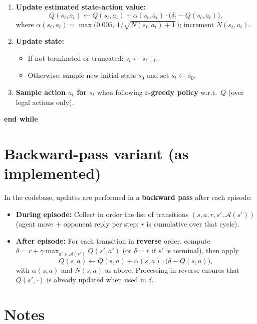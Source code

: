 \documentclass[11pt,a4paper]{article}
\begin{document}
\begin{enumerate}[noitemsep, leftmargin=*]
  \item \textbf{Update estimated state-action value:}
  \[
  Q(s_t, a_t) \leftarrow Q(s_t, a_t) + \alpha(s_t, a_t) \cdot \bigl( \delta_t - Q(s_t, a_t) \bigr),
  \]
  where $\alpha(s_t, a_t) = \max\bigl(0.005,\, 1\big/\sqrt{N(s_t,a_t)+1}\,\bigr)$; increment $N(s_t, a_t)$.

  \item \textbf{Update state:}
  \begin{itemize}[noitemsep]
    \item If not terminated or truncated: $s_t \leftarrow s_{t+1}$.
    \item Otherwise: sample new initial state $s_0$ and set $s_t \leftarrow s_0$.
  \end{itemize}

  \item \textbf{Sample action $a_t$ for $s_t$} when following \textbf{$\varepsilon$-greedy policy} w.r.t.\ $Q$ (over legal actions only).
\end{enumerate}

\textbf{end while}

\hrulefill

\section*{Backward-pass variant (as implemented)}

In the codebase, updates are performed in a \textbf{backward pass} after each episode:

\begin{itemize}[noitemsep]
  \item \textbf{During episode:} Collect in order the list of transitions $(s, a, r, s', \mathcal{A}(s'))$ (agent move + opponent reply per step; $r$ is cumulative over that cycle).
  \item \textbf{After episode:} For each transition in \textbf{reverse} order, compute $\delta = r + \gamma \max_{a' \in \mathcal{A}(s')} Q(s', a')$ (or $\delta = r$ if $s'$ is terminal), then apply
  \[
  Q(s,a) \leftarrow Q(s,a) + \alpha(s,a) \cdot \bigl( \delta - Q(s,a) \bigr),
  \]
  with $\alpha(s,a)$ and $N(s,a)$ as above. Processing in reverse ensures that $Q(s', \cdot)$ is already updated when used in $\delta$.
\end{itemize}

\hrulefill

\section*{Notes}
\end{document}
